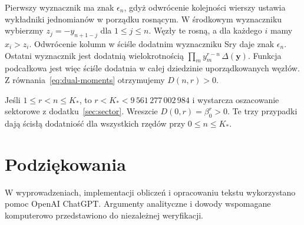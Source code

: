 \documentclass[11pt,a4paper,reqno]{amsart}
\numberwithin{equation}{section}
\begin{document}
Pierwszy wyznacznik ma znak \(\epsilon_n\), gdyż odwrócenie kolejności wierszy ustawia wykładniki jednomianów w porządku rosnącym. W środkowym wyznaczniku wybierzmy \(z_j=-y_{n+1-j}\) dla \(1\le j\le n\). Węzły te rosną, a dla każdego \(i\) mamy \(x_i>z_i\). Odwrócenie kolumn w ściśle dodatnim wyznaczniku Sry daje znak \(\epsilon_n\). Ostatni wyznacznik jest dodatnią wielokrotnością \(\prod_m y_m^{r-n}\,\Delta(\mathbf y)\). Funkcja podcałkowa jest więc ściśle dodatnia w całej dziedzinie uporządkowanych węzłów. Z równania~\eqref{eq:dual-moments} otrzymujemy \(D(n,r)>0\).

Jeśli \(1\le r<n\le K_*\), to \(r<K_*<9\,561\,277\,002\,984\) i wystarcza oszacowanie sektorowe z dodatku~\ref{sec:sector}. Wreszcie \(D(0,r)=\beta_0^r>0\). Te trzy przypadki dają ścisłą dodatniość dla wszystkich rzędów przy \(0\le n\le K_*\).

\section*{Podziękowania} W wyprowadzeniach, implementacji obliczeń i opracowaniu tekstu wykorzystano pomoc OpenAI ChatGPT. Argumenty analityczne i dowody wspomagane komputerowo przedstawiono do niezależnej weryfikacji.
\end{document}

